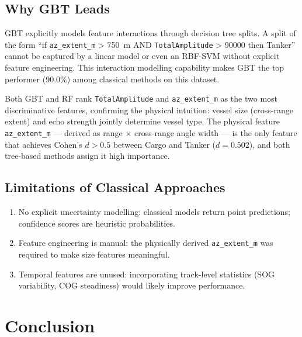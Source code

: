 \documentclass[journal]{IEEEtran}
\begin{document}
\subsection{Why GBT Leads}

GBT explicitly models feature interactions through decision tree splits.
A split of the form ``if \texttt{az\_extent\_m} > 750~m AND
\texttt{TotalAmplitude} > 90000 then Tanker'' cannot be captured by
a linear model or even an RBF-SVM without explicit feature engineering.
This interaction modelling capability makes GBT the top performer (90.0\%)
among classical methods on this dataset.

Both GBT and RF rank \texttt{TotalAmplitude} and \texttt{az\_extent\_m}
as the two most discriminative features, confirming the physical intuition:
vessel size (cross-range extent) and echo strength jointly determine vessel type.
The physical feature \texttt{az\_extent\_m} — derived as range $\times$
cross-range angle width — is the only feature that achieves Cohen's $d > 0.5$
between Cargo and Tanker ($d = 0.502$), and both tree-based methods assign it
high importance.

\subsection{Limitations of Classical Approaches}

\begin{enumerate}
  \item No explicit uncertainty modelling: classical models return point
        predictions; confidence scores are heuristic probabilities.
  \item Feature engineering is manual: the physically derived
        \texttt{az\_extent\_m} was required to make size features meaningful.
  \item Temporal features are unused: incorporating track-level statistics
        (SOG variability, COG steadiness) would likely improve performance.
\end{enumerate}

\section{Conclusion}
\end{document}

